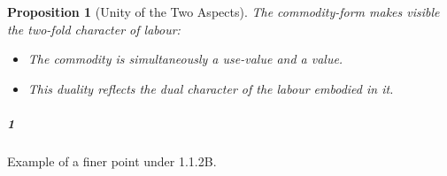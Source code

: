 \documentclass{article}
\newtheorem{proposition}{Proposition}[subsubsection]
\begin{document}
\begin{proposition}[Unity of the Two Aspects]\label{prop:1.1.2.2}
The commodity-form makes visible the two-fold character of labour:
\begin{itemize}[noitemsep]
  \item The commodity is simultaneously a use-value and a value.
  \item This duality reflects the dual character of the labour embodied in it.
\end{itemize}
\end{proposition}

\subparagraph{1} Example of a finer point under 1.1.2B.
\end{document}
